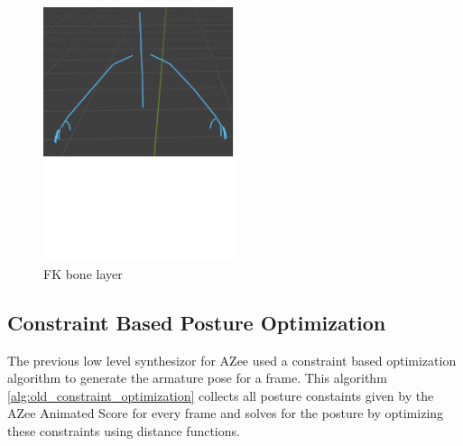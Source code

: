 \documentclass[../../main.tex]{subfiles}
\begin{document}
\begin{figure}
    \centering
    \includegraphics[width=0.5\textwidth]{chapters/rigging_layers/images/fk_layer.png}
    \caption{FK bone layer}
    \label{fig:fk_layer}
\end{figure}

\subsection{Constraint Based Posture Optimization}
\label{ch:rigging_layers:proc_rig_signing_avatars:cb_posegen}

The previous low level synthesizor for AZee \cite{fabrizio} used a constraint based optimization algorithm to generate the armature pose for a frame. This algorithm \ref{alg:old_constraint_optimization} collects all posture constaints given by the AZee Animated Score for every frame and solves for the posture by optimizing these constraints using distance functions. 
\end{document}
